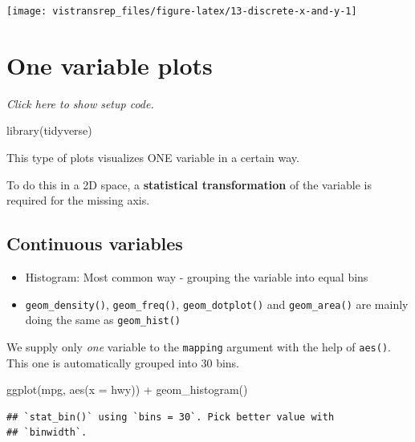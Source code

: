 \documentclass[]{book}
\newenvironment{Shaded}{}{}
\newcommand{\DataTypeTok}[1]{#1}
\newcommand{\KeywordTok}[1]{\textcolor[rgb]{0.00,0.00,1.00}{#1}}
\newcommand{\NormalTok}[1]{#1}
\newcommand{\OperatorTok}[1]{#1}
\newcommand{\StringTok}[1]{\textcolor[rgb]{0.00,0.50,0.50}{#1}}
\begin{document}
\begin{flushright}\texttt{[image: vistransrep\_files/figure-latex/13-discrete-x-and-y-1]} \end{flushright}

\hypertarget{one-variable-plots}{%
\section{One variable plots}\label{one-variable-plots}}

\emph{Click here to show setup code.}

\begin{Shaded}
\begin{Highlighting}[]
\KeywordTok{library}\NormalTok{(tidyverse)}
\end{Highlighting}
\end{Shaded}

This type of plots visualizes ONE variable in a certain way.

To do this in a 2D space, a \textbf{statistical transformation} of the variable is required for the missing axis.

\hypertarget{continuous-variables}{%
\subsection{Continuous variables}\label{continuous-variables}}

\begin{itemize}
\item
  Histogram: Most common way - grouping the variable into equal bins
\item
  \texttt{geom\_density()}, \texttt{geom\_freq()}, \texttt{geom\_dotplot()} and \texttt{geom\_area()} are mainly doing the same as \texttt{geom\_hist()}
\end{itemize}

We supply only \emph{one} variable to the \texttt{mapping} argument with the help of \texttt{aes()}.
This one is automatically grouped into 30 bins.

\begin{Shaded}
\begin{Highlighting}[]
\KeywordTok{ggplot}\NormalTok{(mpg, }\KeywordTok{aes}\NormalTok{(}\DataTypeTok{x =}\NormalTok{ hwy)) }\OperatorTok{+}
\StringTok{  }\KeywordTok{geom_histogram}\NormalTok{()}
\end{Highlighting}
\end{Shaded}

\begin{verbatim}
## `stat_bin()` using `bins = 30`. Pick better value with
## `binwidth`.
\end{verbatim}
\end{document}
